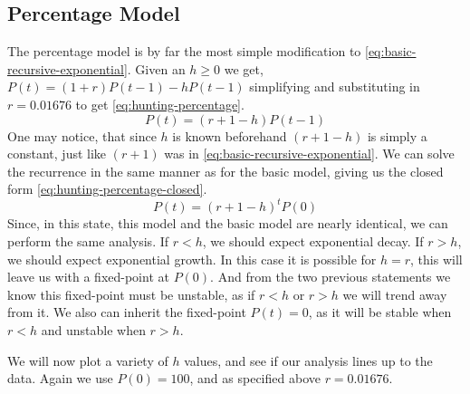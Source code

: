 \documentclass{article}
\begin{document}
\subsection{Percentage Model}
The percentage model is by far the most simple modification to \cref{eq:basic-recursive-exponential}. Given an $h \ge 0$ we get, $P(t) = (1 + r)P(t-1) - hP(t-1)$ simplifying and substituting in $r=0.01676$ to get \cref{eq:hunting-percentage}.
\begin{equation}\label{eq:hunting-percentage}
    P(t) = (r+1-h)P(t-1)
\end{equation}
One may notice, that since $h$ is known beforehand $(r+1-h)$ is simply a constant, just like $(r+1)$ was in \cref{eq:basic-recursive-exponential}. We can solve the recurrence in the same manner as for the basic model, giving us the closed form \cref{eq:hunting-percentage-closed}.
\begin{equation}\label{eq:hunting-percentage-closed}
    P(t) = (r+1-h)^tP(0)
\end{equation}
Since, in this state, this model and the basic model are nearly identical, we can perform the same analysis. If $r < h$, we should expect exponential decay. If $r > h$, we should expect exponential growth. In this case it is possible for $h = r$, this will leave us with a fixed-point at $P(0)$. And from the two previous statements we know this fixed-point must be unstable, as if $r < h$ or $r > h$ we will trend away from it. We also can inherit the fixed-point $P(t)=0$, as it will be stable when $r < h$ and unstable when $r > h$.

We will now plot a variety of $h$ values, and see if our analysis lines up to the data. Again we use $P(0)=100$, and as specified above $r = 0.01676$.
\end{document}
